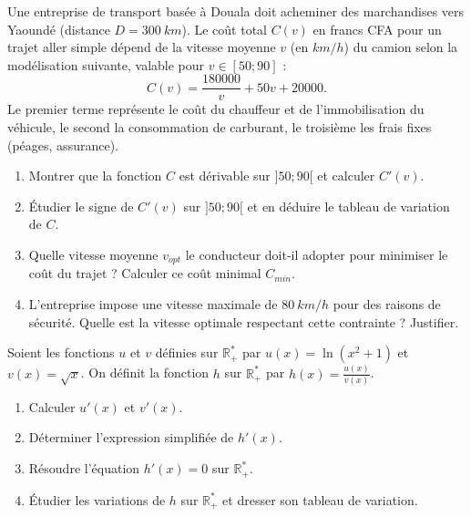 \documentclass[11pt]{article}
\begin{document}
\begin{exercice}
Une entreprise de transport basée à Douala doit acheminer des marchandises vers Yaoundé (distance $D = \SI{300}{km}$). Le coût total $C(v)$ en francs CFA pour un trajet aller simple dépend de la vitesse moyenne $v$ (en $\si{km/h}$) du camion selon la modélisation suivante, valable pour $v \in [50 ; 90]$ :
\[
C(v) = \frac{180000}{v} + 50v + 20000.
\]
Le premier terme représente le coût du chauffeur et de l'immobilisation du véhicule, le second la consommation de carburant, le troisième les frais fixes (péages, assurance).
\begin{enumerate}
    \item Montrer que la fonction $C$ est dérivable sur $]50 ; 90[$ et calculer $C'(v)$.
    \item Étudier le signe de $C'(v)$ sur $]50 ; 90[$ et en déduire le tableau de variation de $C$.
    \item Quelle vitesse moyenne $v_{opt}$ le conducteur doit-il adopter pour minimiser le coût du trajet ? Calculer ce coût minimal $C_{min}$.
    \item L'entreprise impose une vitesse maximale de $\SI{80}{km/h}$ pour des raisons de sécurité. Quelle est la vitesse optimale respectant cette contrainte ? Justifier.
\end{enumerate}
\end{exercice}

\begin{exercice}
Soient les fonctions $u$ et $v$ définies sur $\mathbb{R}^*_+$ par $u(x) = \ln(x^2 + 1)$ et $v(x) = \sqrt{x}$.
On définit la fonction $h$ sur $\mathbb{R}^*_+$ par $h(x) = \frac{u(x)}{v(x)}$.
\begin{enumerate}
    \item Calculer $u'(x)$ et $v'(x)$.
    \item Déterminer l'expression simplifiée de $h'(x)$.
    \item Résoudre l'équation $h'(x) = 0$ sur $\mathbb{R}^*_+$.
    \item Étudier les variations de $h$ sur $\mathbb{R}^*_+$ et dresser son tableau de variation.
\end{enumerate}
\end{exercice}
\end{document}
